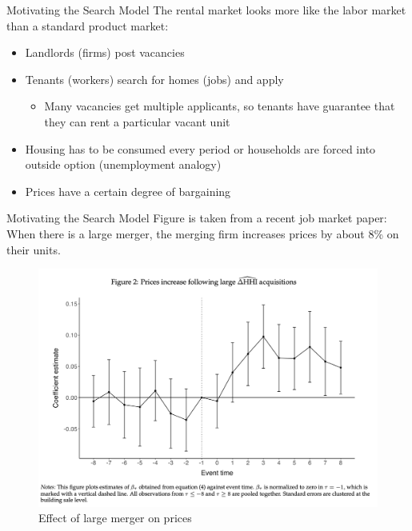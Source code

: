 \documentclass[10pt, xcolor=dvipsnames]{beamer}
\begin{document}
\begin{frame}{Motivating the Search Model}
The rental market looks more like the labor market than a standard product market:\\
    \begin{itemize}
        \item Landlords (firms) post vacancies
        \item Tenants (workers) search for homes (jobs) and apply
        \begin{itemize}
            \item Many vacancies get multiple applicants, so tenants have guarantee that they can rent a particular vacant unit
        \end{itemize}
        \item Housing has to be consumed every period or households are forced into outside option (unemployment analogy)
        \item Prices have a certain degree of bargaining
    \end{itemize}
    
\end{frame}

\begin{frame}{Motivating the Search Model}
Figure is taken from a recent job market paper: When there is a large merger, the merging firm increases prices by about 8\% on their units.
    \begin{figure}
        \centering
        \includegraphics[width=0.5\linewidth]{figs/fern-jmp-prices.png}
        \caption{Effect of large merger on prices}
        \label{fig:fern-prices}
    \end{figure}
\end{frame}
\end{document}
